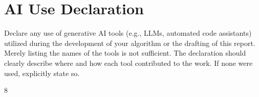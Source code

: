 \documentclass[runningheads]{llncs}
\begin{document}


\section{AI Use Declaration}
\begin{guidance}
    Declare any use of generative AI tools (e.g., LLMs, automated code assistants) utilized during the development of your algorithm or the drafting of this report. Merely listing the names of the tools is not sufficient. The declaration
should clearly describe where and how each tool contributed to the work. If none were used, explicitly state so.
\end{guidance}

\begin{thebibliography}{8}
\end{thebibliography}
\end{document}
